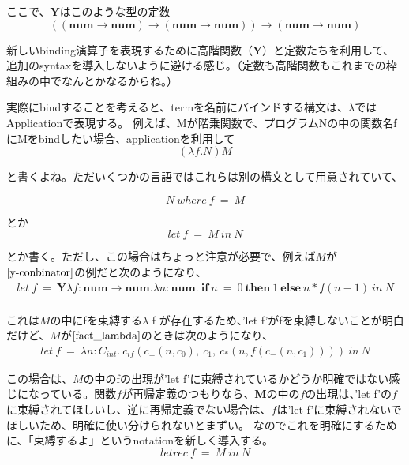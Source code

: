 \documentclass[9pt,fleqn]{jarticle}
\begin{document}
ここで、$\bm{Y}$はこのような型の定数
\begin{equation*}
	((\bm{num} \rightarrow \bm{num}) \rightarrow (\bm{num} \rightarrow \bm{num})) \rightarrow (\bm{num} \rightarrow \bm{num})
\end{equation*}


新しいbinding演算子を表現するために高階関数（$\bm{Y}$）と定数たちを利用して、追加のsyntaxを導入しないように避ける感じ。（定数も高階関数もこれまでの枠組みの中でなんとかなるからね。）

\nl
実際にbindすることを考えると、termを名前にバインドする構文は、$\lambda$ではApplicationで表現する。
例えば、Mが階乗関数で、プログラムNの中の関数名fにMをbindしたい場合、applicationを利用して
\begin{equation*}
	(\lambda f. N) M
\end{equation*}

と書くよね。ただいくつかの言語ではこれらは別の構文として用意されていて、

\begin{equation*}
	N\ where\ f\ =\ M
\end{equation*}

とか
\begin{equation*}
	let\ f\ =\ M\ in\ N
\end{equation*}

とか書く。ただし、この場合はちょっと注意が必要で、例えば$M$が$\ref{y-conbinator}$の例だと次のようになり、
\begin{eqnarray*}
	let\ f\ =\ \bm{Y} \lambda f: \bm{num}\rightarrow\bm{num}. λn:\bm{num}.\ \bm{if}\ n\ =\ 0\ \bm{then}\ 1\ \bm{else}\ n*f(n-1)
\ in\ N \\
\end{eqnarray*}

これは$M$の中にfを束縛する$\lambda$ f が存在するため、'let f'がfを束縛しないことが明白だけど、$M$が$\ref{fact_lambda}$のときは次のようになり、
\begin{eqnarray*}
	let\ f\ =\ \lambda n : C_{int}.\ c_{if}(c_{=}(n, c_0),\ c_1,\ c_*(n, f(c_{-}(n, c_1))))\ in\ N
\end{eqnarray*}

この場合は、$M$の中のfの出現が'let f'に束縛されているかどうか明確ではない感じになっている。関数$f$が再帰定義のつもりなら、$\bm{M}$の中の$f$の出現は、'let f'の$f$に束縛されてほしいし、逆に再帰定義でない場合は、$f$は'let f'に束縛されないでほしいため、明確に使い分けられないとまずい。
なのでこれを明確にするために、「束縛するよ」というnotationを新しく導入する。
\begin{equation}\label{let_rec}
	letrec\ f\ =\ M\ in\ N
\end{equation}
\end{document}
